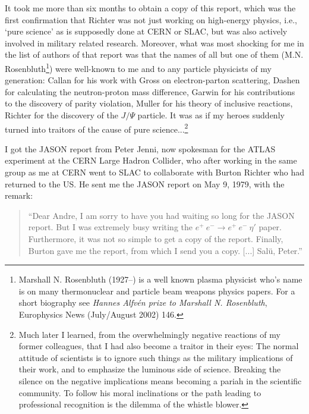 \documentclass [12pt,a4paper,     ]{report} %
\begin{document}
It took me more than six months to obtain a copy of this report, which was the first confirmation that Richter was not just working on high-energy physics, i.e., `pure science' as is supposedly done at CERN or SLAC, but was also actively involved in military related research.  Moreover, what was most shocking for me in the list of authors of that report was that the names of all but one of them (M.N. Rosenbluth\footnote{Marshall N. Rosenbluth (1927--) is a well known plasma physicist who's name is on many thermonuclear and particle beam weapons physics papers. For a short biography see \emph{Hannes Alfv\'en prize to Marshall N. Rosenbluth}, Europhysics News (July/August 2002) 146. }) were well-known to me and to any particle physicists of my generation:  Callan for his work with Gross on electron-parton scattering, Dashen for calculating the neutron-proton mass difference, Garwin for his contributions to the discovery of parity violation, Muller for his theory of inclusive reactions, Richter for the discovery of the $J/\Psi$ particle.  It was as if my heroes suddenly turned into traitors of the cause of pure science...\footnote{Much later I learned, from the overwhelmingly negative reactions of my former colleagues, that I had also become a traitor in their eyes:  The normal attitude of scientists is to ignore such things as the military implications of their work, and to emphasize the luminous side of science.  Breaking the silence on the negative implications means becoming a pariah in the scientific community.  To follow his moral inclinations or the path leading to professional recognition is the dilemma of the whistle blower.}

I got the JASON report from Peter Jenni, now spokesman for the ATLAS experiment at the CERN Large Hadron Collider, who after working in the same group as me at CERN went to SLAC to collaborate with Burton Richter who had returned to the US.  He sent me the JASON report on May 9, 1979, with the remark:
%
\begin{quote}
``Dear Andre, I am sorry to have you had waiting so long for the JASON report.  But I was extremely busy writing the $e^+ ~ e^- \rightarrow e^+ ~ e^- ~ \eta'$ paper.  Furthermore, it was not so simple to get a copy of the report.  Finally, Burton gave me the report, from which I send you a copy. [...] Sal\"u, Peter.''
\end{quote}
\end{document}
